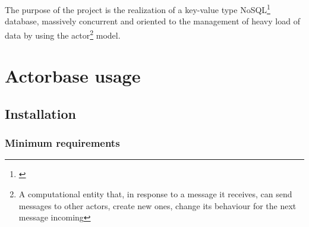 \documentclass{scalatekids-article}
\begin{document}
The purpose of the project is the realization of a key-value type
NoSQL\footnote{\label{nosql}} database, massively concurrent and oriented to the
management of heavy load of data by using the actor\footnote{A computational entity
that, in response to a message it receives, can send messages to other actors,
create new ones, change its behaviour for the next message incoming\label{actor}}
model.











\section{Actorbase usage}

\subsection{Installation}

\subsubsection{Minimum requirements}
\end{document}
